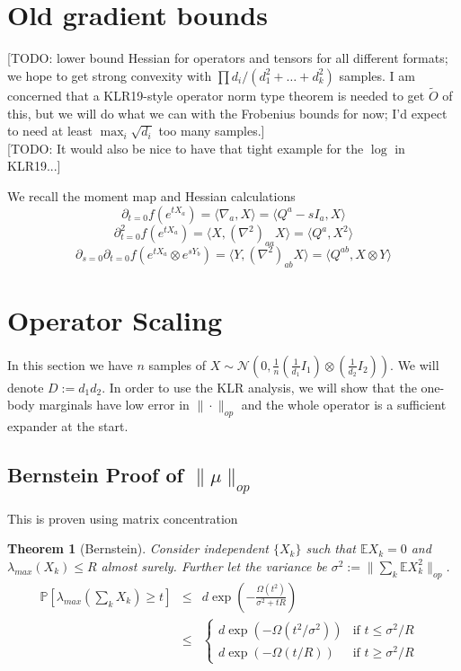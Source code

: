 \documentclass{article}
\newtheorem{theorem}{Theorem}
\newcommand{\E}{\mathbb{E}}
\renewcommand{\Pr}{\mathbb{P}}
\newcommand\cN{\mathcal{N}}
\newcommand{\TODO}[1]{{\color{blue}[TODO: #1]}}
\begin{document}
\section{Old gradient bounds}

\TODO{lower bound Hessian for operators and tensors for all different formats; we hope to get strong convexity with $\prod d_i /(d_1^2 + \dots + d_k^2)$ samples. I am concerned that a KLR19-style operator norm type theorem is needed to get $\tilde{O}$ of this, but we will do what we can with the Frobenius bounds for now; I'd expect to need at least $\max_i \sqrt{d_i}$ too many samples.}\\
\TODO{It would also be nice to have that tight example for the $\log$ in KLR19...}

We recall the moment map and Hessian calculations
\[ \partial_{t=0} f(e^{tX_{a}}) = \langle \nabla_{a}, X \rangle = \langle Q^{a} - sI_{a}, X \rangle   \]
\[ \partial_{t=0}^{2} f(e^{tX_{a}}) = \langle X, (\nabla^{2})_{aa} X \rangle = \langle Q^{a}, X^{2} \rangle  \]
\[ \partial_{s=0} \partial_{t=0} f(e^{tX_{a}} \otimes e^{sY_{b}}) = \langle Y, (\nabla^{2})_{ab} X \rangle = \langle Q^{ab}, X \otimes Y \rangle   \]

\section{Operator Scaling}
In this section we have $n$ samples of $X \sim \cN(0,\frac{1}{n} (\frac{1}{d_{1}} I_{1}) \otimes (\frac{1}{d_{2}} I_{2}))$. We will denote $D := d_{1} d_{2}$. In order to use the KLR analysis, we will show that the one-body marginals have low error in $\|\cdot\|_{op}$ and the whole operator is a sufficient expander at the start.

\subsection{Bernstein Proof of $\|\mu\|_{op}$}
This is proven using matrix concentration

\begin{theorem} [Bernstein]
Consider independent $\{X_{k}\}$ such that $\E X_{k} = 0$ and $\lambda_{max}(X_{k}) \leq R$ almost surely. Further let the variance be $\sigma^{2} := \|\sum_{k} \E X_{k}^{2} \|_{op}$.
\begin{eqnarray*} \Pr [ \lambda_{max} \left( \sum_{k} X_{k}  \right) \geq t ] & \leq & d \exp\left( - \frac{\Omega(t^{2})}{\sigma^{2} + t R} \right)
\\ & \leq & \begin{cases}
d \exp ( - \Omega(t^{2}/\sigma^{2}) ) & \text{if $t \leq \sigma^{2}/R$ }
\\ d \exp ( - \Omega(t/R) )           & \text{if $t \geq \sigma^{2}/R$}
\end{cases}
\end{eqnarray*}
\end{theorem}
\end{document}
